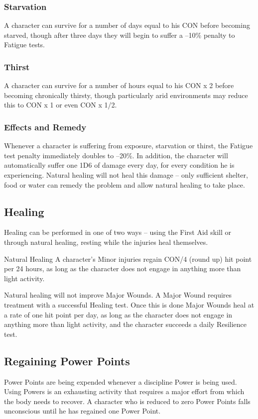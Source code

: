 \subsubsection{Starvation}
A character can survive for a number of days equal to his CON before becoming starved, though after three days they will begin to suffer a –10\% penalty to Fatigue tests. 

\subsubsection{Thirst}
A character can survive for a number of hours equal to his CON x 2 before becoming chronically thirsty, though particularly arid environments may reduce this to CON x 1 or even CON x 1/2. 

\subsubsection{Effects and Remedy}
Whenever a character is suffering from exposure, starvation or thirst, the Fatigue test penalty immediately doubles to –20\%. In addition, the character will automatically suffer one 1D6 of damage every day, for every condition he is experiencing. Natural healing will not heal this damage – only sufficient shelter, food or water can remedy the problem and allow natural healing to take place. 


\subsection{Healing}
Healing can be performed in one of two ways – using the First Aid skill or through natural healing, resting while the injuries heal themselves. 

Natural Healing 
A character’s Minor injuries regain CON/4 (round up) hit point per 24 hours, as long as the character does not engage in anything more than light activity. 

Natural healing will not improve Major Wounds. A Major Wound requires treatment with a successful Healing test. Once this is done Major Wounds heal at a rate of one hit point per day, as long as the character does not engage in anything more than light activity, and the character succeeds a daily Resilience test. 

\subsection{Regaining Power Points}
Power Points are being expended whenever a discipline Power is being used. Using Powers is an exhausting activity that requires a major effort from which the body needs to recover. A character who is reduced to zero Power Points falls unconscious until he has regained one Power Point. 

